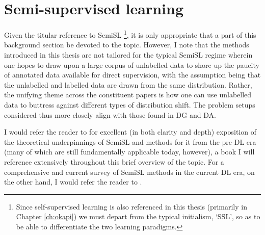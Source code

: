 \section{ Semi-supervised learning }\label{sec:semisl}
%
Given the titular reference to \ac{SemiSL}
%
\footnote{ 
  Since self-supervised learning is also referenced in this thesis (primarily in Chapter
  \ref{ch:okapi}) we must depart from the typical initialism, `SSL', so as to be able to
  differentiate the two learning paradigms.
%
},
%
 it is only appropriate that a part of this background section be devoted to the
topic.
%
However, I note that the methods introduced in this thesis are not tailored for the typical
\ac{SemiSL} regime wherein one hopes to draw upon a large corpus of unlabelled data to shore up the
paucity of annotated data available for direct supervision, with the assumption being that the
unlabelled and labelled data are drawn from the same distribution.
%
Rather, the unifying theme across the constituent papers is how one can use unlabelled data to
buttress against different types of distribution shift.
%
The problem setups considered thus more closely align with those found in \ac{DG} and \ac{DA}. 

I would refer the reader to \citet{chapelle2009semi} for excellent (in both clarity and depth)
exposition of the theoretical underpinnings of \ac{SemiSL} and methods for it from the
pre-\ac{DL} era (many of which are still fundamentally applicable today, however), a book I
will reference extensively throughout this brief overview of the topic.
%
For a comprehensive and current survey of \ac{SemiSL} methods in the current \ac{DL} era, on the
other hand, I would refer the reader to \citet{yang2022survey}.
%

